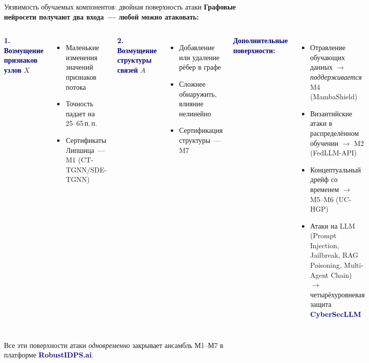 \documentclass[10pt,aspectratio=169]{beamer}
\newcommand{\bn}[1]{\textcolor{navy}{\textbf{#1}}}
\begin{document}
\begin{frame}{Уязвимость обучаемых компонентов: двойная поверхность атаки}
\small
\textbf{Графовые нейросети получают два входа~--- любой можно
атаковать:}
\smallskip
\begin{columns}[T,onlytextwidth]
\bn{1. Возмущение признаков узлов} $X$
\begin{itemize}\setlength\itemsep{0pt}
\item Маленькие изменения значений признаков потока
\item Точность падает на 25--65\,п.\,п.
\item Сертификаты Липшица~--- M1 (CT-TGNN/SDE-TGNN)
\end{itemize}
\smallskip
\bn{2. Возмущение структуры связей} $A$
\begin{itemize}\setlength\itemsep{0pt}
\item Добавление или удаление рёбер в графе
\item Сложнее обнаружить, влияние нелинейно
\item Сертификация структуры~--- M7
\end{itemize}

\bn{Дополнительные поверхности:}
\begin{itemize}\setlength\itemsep{0pt}
\item Отравление обучающих данных
$\to$ \emph{поддерживается} M4 (MambaShield)
\item Византийские атаки в распределённом обучении
$\to$ M2 (FedLLM-API)
\item Концептуальный дрейф со временем
$\to$ M5--M6 (UC-HGP)
\item Атаки на LLM (Prompt Injection, Jailbreak,
RAG Poisoning, Multi-Agent Chain)
$\to$ четырёхуровневая защита \bn{CyberSecLLM}
\end{itemize}
\end{columns}
\medskip
\begin{block}{}
\small Все эти поверхности атаки \emph{одновременно} закрывает
ансамбль М1--М7 в платформе \bn{RobustIDPS.ai}.
\end{block}
\end{frame}
\end{document}
